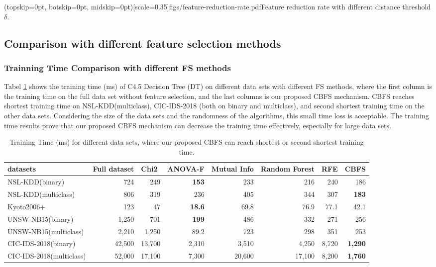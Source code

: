 \documentclass{ieeeaccess}
\theoremstyle{definition}
\begin{document}
\Figure[!htpb](topskip=0pt, botskip=0pt, midskip=0pt)[scale=0.35]{figs/feature-reduction-rate.pdf}{Feature reduction rate with different distance threshold $\delta$. \label{fig:feature-reduction-rate}}


\subsection{Comparison with different feature selection methods}

\subsubsection{Trainning Time Comparison with different FS methods}

Tabel \ref{tab:training-time} shows the training time (ms) of C4.5 Decision Tree (DT) \cite{quinlan2014c4} on different data sets with different FS methods, where the first column is the training time on the full data set without feature selection, and the last columns is our proposed CBFS mechanism. CBFS reaches shortest training time on NSL-KDD(multiclass), CIC-IDS-2018 (both on binary and multiclass), and second shortest training time on the other data sets. Considering the size of the data sets and the randomness of the algorithms, this small time loss is acceptable. The training time results prove that our proposed CBFS mechanism can decrease the training time effectively, especially for large data sets.

\begin{table}[htbp]
    \centering
    \caption{Training Time (ms) for different data sets, where our proposed CBFS can reach shortest or second shortest training time.}
    \begin{tabular}{lrrrrrrr}
        \toprule
        datasets & \multicolumn{1}{l}{Full dataset} & \multicolumn{1}{l}{Chi2} & \multicolumn{1}{l}{ANOVA-F} & \multicolumn{1}{l}{Mutual Info} & \multicolumn{1}{l}{Random Forest} & \multicolumn{1}{l}{RFE} & \multicolumn{1}{l}{CBFS} \\
        \midrule
        NSL-KDD(binary) & 724   & 249   & \textbf{153} & 233   & 216   & 240   & 186 \\
        NSL-KDD(multiclass) & 806   & 319   & 236   & 405   & 344   & 307   & \textbf{183} \\
        Kyoto2006+ & 123   & 47    & \textbf{18.6} & 69.8  & 76.9  & 77.1  & 42.1 \\
        UNSW-NB15(binary) & 1,250  & 701   & \textbf{199} & 486   & 332   & 271   & 256 \\
        UNSW-NB15(multiclass) & 2,210  & 1,250  & 89.2  & 723   & 298   & 351   & 253 \\
        CIC-IDS-2018(binary) & 42,500 & 13,700 & 2,310  & 3,510  & 4,250  & 8,720  & \textbf{1,290} \\
        CIC-IDS-2018(multiclass) & 52,000 & 17,100 & 7,300  & 20,600 & 17,100 & 8,200  & \textbf{1,760} \\
        \bottomrule
        \end{tabular}%
    \label{tab:training-time}%
\end{table}%
\end{document}
